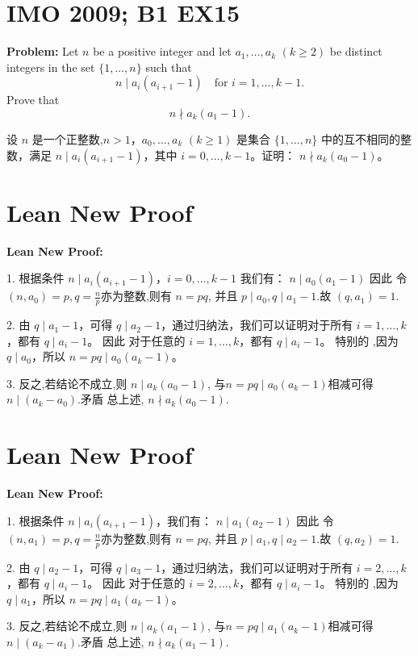 \documentclass[a4paper]{article}
\begin{document}
\section*{IMO 2009; B1 EX15}
    \textbf{Problem:}
    Let $n$ be a positive integer and let $a_1,\ldots,a_k$ $(k \geq 2)$ be distinct integers in the set $\{1,\ldots,n\}$ such that 
    \[n \mid a_i(a_{i+1}-1) \quad \text{for } i = 1,\ldots,k-1.\]
    Prove that 
    \[n \nmid a_k(a_1-1).\]

    \[ \]
    设 $n$ 是一个正整数,$n > 1$，$a_0, \ldots, a_k$ $(k \geq 1)$ 是集合 $\{1, \ldots, n\}$ 中的互不相同的整数，满足
    $n \mid a_i(a_{i+1}-1)$，其中 $i = 0, \ldots, k-1$。证明：
    $n \nmid a_k(a_0-1)$。

\section*{Lean New Proof}
    \textbf{Lean New Proof:}
    
    1. 根据条件 $n \mid a_i(a_{i+1}-1)$，$i = 0,\ldots,k-1$ 我们有：
    $n \mid a_0(a_1 - 1)$ 因此 令 $(n,a_0) = p,q =\frac{n}{p}$亦为整数,则有 $n = pq$,
    并且 $p \mid a_0,q \mid a_1 - 1$.故 $(q,a_1) = 1$.
    
    2. 由 $q \mid a_1 - 1$，可得 $q \mid a_2 - 1$，通过归纳法，我们可以证明对于所有 $i = 1, \ldots, k$，都有 $q \mid a_i - 1$。
    因此 对于任意的 $i = 1, \ldots, k$，都有 $q \mid a_i - 1$。
    特别的 ,因为 $q \mid a_0$，所以 $n = pq \mid a_0(a_k - 1)$。
    
    3. 反之,若结论不成立,则 $n \mid a_k(a_0 - 1)$, 与$n = pq \mid a_0(a_k - 1)$相减可得 $n \mid (a_k - a_0)$.矛盾
    总上述, $n \nmid a_k(a_0 - 1)$.

\section*{Lean New Proof}
    \textbf{Lean New Proof:}
    
    1. 根据条件 $n \mid a_i(a_{i+1}-1)$，我们有：
    $n \mid a_1(a_2 - 1)$ 因此 令 $(n,a_1) = p,q =\frac{n}{p}$亦为整数,则有 $n = pq$,
    并且 $p \mid a_1,q \mid a_2 - 1$.故 $(q,a_2) = 1$.
    
    2. 由 $q \mid a_2 - 1$，可得 $q \mid a_3 - 1$，通过归纳法，我们可以证明对于所有 $i = 2, \ldots, k$，都有 $q \mid a_i - 1$。
    因此 对于任意的 $i = 2, \ldots, k$，都有 $q \mid a_i - 1$。
    特别的 ,因为 $q \mid a_1$，所以 $n = pq \mid a_1(a_k - 1)$。
    
    3. 反之,若结论不成立,则 $n \mid a_k(a_1 - 1)$, 与$n = pq \mid a_1(a_k - 1)$相减可得 $n \mid (a_k - a_1)$.矛盾
    总上述, $n \nmid a_k(a_1 - 1)$.
\end{document}
